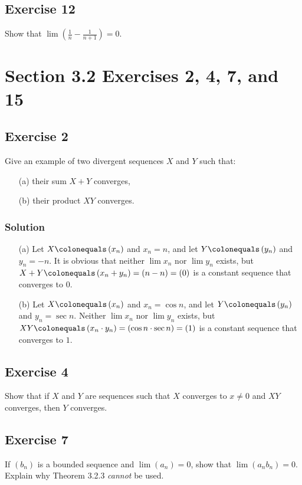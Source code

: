 \documentclass[12pt]{article}
\begin{document}
\subsection*{Exercise 12}
Show that $\displaystyle\lim\left(\frac{1}{n} - \frac{1}{n + 1}\right) = 0$.

\section*{Section 3.2 Exercises 2, 4, 7, and 15}

\subsection*{Exercise 2}
Give an example of two divergent sequences $X$ and $Y$ such that:
\begin{itemize}
\item[(a)]
their sum $X + Y$ converges,
\item[(b)]
their product $XY$ converges.
\end{itemize}

\subsubsection*{Solution}
\begin{itemize}
\item[(a)]
Let $X \colonequals \left(x_n\right)$ and $x_n = n$, and let $Y \colonequals \left(y_n\right)$ and $y_n = -n$. It is obvious that neither $\lim x_n$ nor $\lim y_n$ exists, but $X + Y \colonequals \left(x_n + y_n\right) = \left(n - n\right) = \left(0\right)$ is a constant sequence that converges to $0$.

\item[(b)]
Let $X \colonequals \left(x_n\right)$ and $x_n = \cos n$, and let $Y \colonequals \left(y_n\right)$ and $y_n = \sec n$. Neither $\lim x_n$ nor $\lim y_n$ exists, but $XY \colonequals \left(x_n \cdot y_n\right) = \left(\cos n \cdot \sec n\right) = \left(1 \right)$ is a constant sequence that converges to $1$.
\end{itemize}

\subsection*{Exercise 4}
Show that if $X$ and $Y$ are sequences such that $X$ converges to $x \neq 0$ and $XY$ converges, then $Y$ converges.

\subsection*{Exercise 7}
If $\left(b_n\right)$ is a bounded sequence and $\lim\left(a_n\right) = 0$, show that $\lim\left(a_n b_n\right) = 0$. Explain why Theorem 3.2.3 \textit{cannot} be used.
\end{document}
